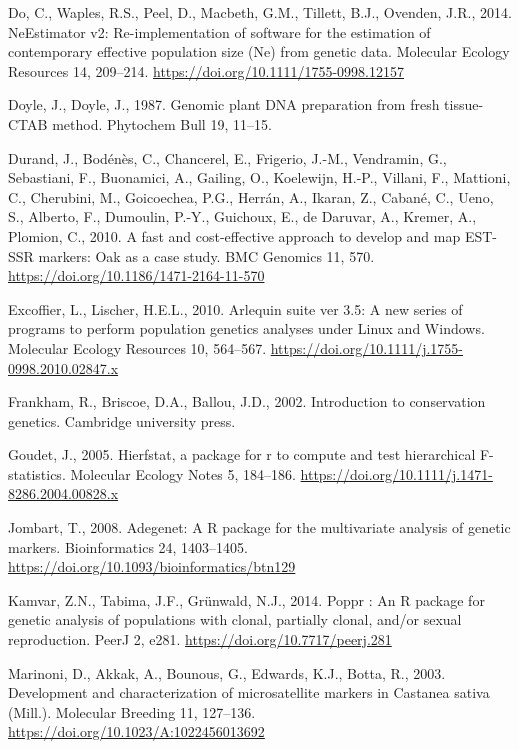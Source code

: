 \documentclass[12pt,a4paper,]{report}
\begin{document}
\leavevmode\hypertarget{ref-Do2014}{}%
Do, C., Waples, R.S., Peel, D., Macbeth, G.M., Tillett, B.J., Ovenden,
J.R., 2014. NeEstimator v2: Re-implementation of software for the
estimation of contemporary effective population size (Ne) from genetic
data. Molecular Ecology Resources 14, 209--214.
\url{https://doi.org/10.1111/1755-0998.12157}

\leavevmode\hypertarget{ref-doyle1987genomic}{}%
Doyle, J., Doyle, J., 1987. Genomic plant DNA preparation from fresh
tissue-CTAB method. Phytochem Bull 19, 11--15.

\leavevmode\hypertarget{ref-durand_fast_2010}{}%
Durand, J., Bodénès, C., Chancerel, E., Frigerio, J.-M., Vendramin, G.,
Sebastiani, F., Buonamici, A., Gailing, O., Koelewijn, H.-P., Villani,
F., Mattioni, C., Cherubini, M., Goicoechea, P.G., Herrán, A., Ikaran,
Z., Cabané, C., Ueno, S., Alberto, F., Dumoulin, P.-Y., Guichoux, E., de
Daruvar, A., Kremer, A., Plomion, C., 2010. A fast and cost-effective
approach to develop and map EST-SSR markers: Oak as a case study. BMC
Genomics 11, 570. \url{https://doi.org/10.1186/1471-2164-11-570}

\leavevmode\hypertarget{ref-excoffier_arlequin_2010}{}%
Excoffier, L., Lischer, H.E.L., 2010. Arlequin suite ver 3.5: A new
series of programs to perform population genetics analyses under Linux
and Windows. Molecular Ecology Resources 10, 564--567.
\url{https://doi.org/10.1111/j.1755-0998.2010.02847.x}

\leavevmode\hypertarget{ref-frankham_introduction_2002}{}%
Frankham, R., Briscoe, D.A., Ballou, J.D., 2002. Introduction to
conservation genetics. Cambridge university press.

\leavevmode\hypertarget{ref-goudet_hierfstat_2005}{}%
Goudet, J., 2005. Hierfstat, a package for r to compute and test
hierarchical F-statistics. Molecular Ecology Notes 5, 184--186.
\url{https://doi.org/10.1111/j.1471-8286.2004.00828.x}

\leavevmode\hypertarget{ref-Jombart2008}{}%
Jombart, T., 2008. Adegenet: A R package for the multivariate analysis
of genetic markers. Bioinformatics 24, 1403--1405.
\url{https://doi.org/10.1093/bioinformatics/btn129}

\leavevmode\hypertarget{ref-Kamvar2014}{}%
Kamvar, Z.N., Tabima, J.F., Grünwald, N.J., 2014. Poppr : An R package
for genetic analysis of populations with clonal, partially clonal,
and/or sexual reproduction. PeerJ 2, e281.
\url{https://doi.org/10.7717/peerj.281}

\leavevmode\hypertarget{ref-marinoni_development_2003}{}%
Marinoni, D., Akkak, A., Bounous, G., Edwards, K.J., Botta, R., 2003.
Development and characterization of microsatellite markers in Castanea
sativa (Mill.). Molecular Breeding 11, 127--136.
\url{https://doi.org/10.1023/A:1022456013692}
\end{document}
